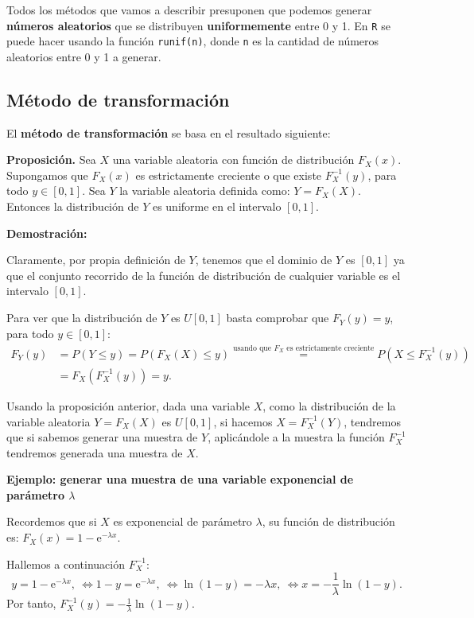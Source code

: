 \documentclass[
  letterpaper,
  DIV=11,
  numbers=noendperiod]{scrreprt}
\begin{document}
Todos los métodos que vamos a describir presuponen que podemos generar
\textbf{números aleatorios} que se distribuyen \textbf{uniformemente}
entre 0 y 1. En \texttt{R} se puede hacer usando la función
\texttt{runif(n)}, donde \texttt{n} es la cantidad de números aleatorios
entre 0 y 1 a generar.

\hypertarget{muxe9todo-de-transformaciuxf3n}{%
\subsection{Método de
transformación}\label{muxe9todo-de-transformaciuxf3n}}

El \textbf{método de transformación} se basa en el resultado siguiente:

\textbf{Proposición.} Sea \(X\) una variable aleatoria con función de
distribución \(F_X(x)\). Supongamos que \(F_X(x)\) es estrictamente
creciente o que existe \(F_X^{-1}(y)\), para todo \(y\in [0,1]\). Sea
\(Y\) la variable aleatoria definida como: \(Y=F_X(X)\). Entonces la
distribución de \(Y\) es uniforme en el intervalo \([0,1]\).

\textbf{Demostración:}

Claramente, por propia definición de \(Y\), tenemos que el dominio de
\(Y\) es \([0,1]\) ya que el conjunto recorrido de la función de
distribución de cualquier variable es el intervalo \([0,1]\).

Para ver que la distribución de \(Y\) es \(U[0,1]\) basta comprobar que
\(F_Y(y)=y\), para todo \(y\in [0,1]\): \[
\begin{array}{rl}
F_Y(y) & =P(Y\leq y)=P(F_X(X)\leq y)\stackrel{\mbox{usando que $F_X$ es estrictamente creciente}}{=} P(X\leq F_X^{-1}(y)) \\ & =F_X(F_X^{-1}(y))=y.
\end{array}
\]

Usando la proposición anterior, dada una variable \(X\), como la
distribución de la variable aleatoria \(Y=F_X(X)\) es \(U[0,1]\), si
hacemos \(X=F_X^{-1}(Y)\), tendremos que si sabemos generar una muestra
de \(Y\), aplicándole a la muestra la función \(F_X^{-1}\) tendremos
generada una muestra de \(X\).

\textbf{Ejemplo: generar una muestra de una variable exponencial de
parámetro \(\lambda\)}

Recordemos que si \(X\) es exponencial de parámetro \(\lambda\), su
función de distribución es: \(F_X(x)=1-\mathrm{e}^{-\lambda x}\).

Hallemos a continuación \(F_X^{-1}\): \[
y=1-\mathrm{e}^{-\lambda x},\ \Leftrightarrow 1-y=\mathrm{e}^{-\lambda x},\ \Leftrightarrow \ln(1-y)=-\lambda x,\ \Leftrightarrow x=-\frac{1}{\lambda}\ln(1-y).
\] Por tanto, \(F_X^{-1}(y)=-\frac{1}{\lambda}\ln(1-y)\).
\end{document}

